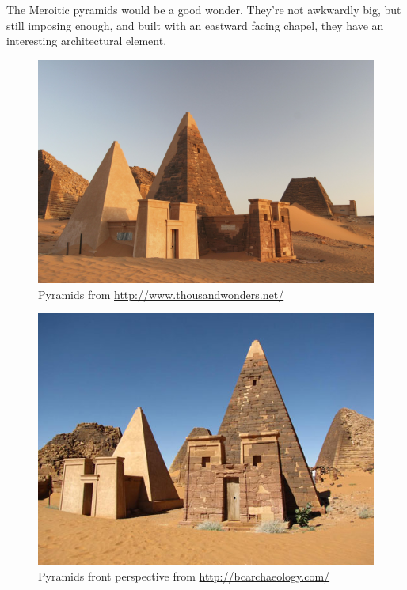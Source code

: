 \documentclass[a4paper,12pt]{scrreprt}
\begin{document}
The Meroitic pyramids would be a good wonder. They’re not awkwardly big, but still imposing enough, and built with an eastward facing chapel, they have an interesting architectural element.

\begin{figure}[H]
	\centering
	\includegraphics[width=\textwidth]{img/wonder/nubian_pyramids_original}
	\caption{Pyramids from \url{http://www.thousandwonders.net/}}
\end{figure}

\begin{figure}[H]
	\centering
	\includegraphics[width=\textwidth]{img/wonder/meroe-pyramids}
	\caption{Pyramids front perspective from \url{http://bcarchaeology.com/}}
\end{figure}
\end{document}
